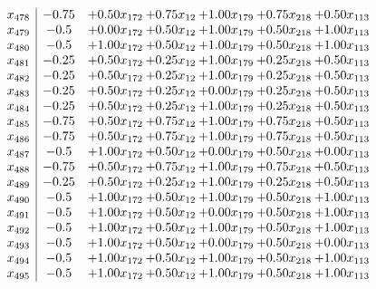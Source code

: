 \documentclass[8pt]{article}
\begin{document}
\[\begin{array}{c| c c@{\hskip 2pt} c@{\hskip 2pt} c@{\hskip 2pt} c@{\hskip 2pt} c@{\hskip 2pt} }
 x_{478}   &  -0.75 & +  0.50 x_{172} & +  0.75 x_{12} & +  1.00 x_{179} & +  0.75 x_{218} & +  0.50 x_{113}\\
 x_{479}   &  -0.5 & +  0.00 x_{172} & +  0.50 x_{12} & +  1.00 x_{179} & +  0.50 x_{218} & +  1.00 x_{113}\\
 x_{480}   &  -0.5 & +  1.00 x_{172} & +  0.50 x_{12} & +  1.00 x_{179} & +  0.50 x_{218} & +  1.00 x_{113}\\
 x_{481}   &  -0.25 & +  0.50 x_{172} & +  0.25 x_{12} & +  1.00 x_{179} & +  0.25 x_{218} & +  0.50 x_{113}\\
 x_{482}   &  -0.25 & +  0.50 x_{172} & +  0.25 x_{12} & +  1.00 x_{179} & +  0.25 x_{218} & +  0.50 x_{113}\\
 x_{483}   &  -0.25 & +  0.50 x_{172} & +  0.25 x_{12} & +  0.00 x_{179} & +  0.25 x_{218} & +  0.50 x_{113}\\
 x_{484}   &  -0.25 & +  0.50 x_{172} & +  0.25 x_{12} & +  1.00 x_{179} & +  0.25 x_{218} & +  0.50 x_{113}\\
 x_{485}   &  -0.75 & +  0.50 x_{172} & +  0.75 x_{12} & +  1.00 x_{179} & +  0.75 x_{218} & +  0.50 x_{113}\\
 x_{486}   &  -0.75 & +  0.50 x_{172} & +  0.75 x_{12} & +  1.00 x_{179} & +  0.75 x_{218} & +  0.50 x_{113}\\
 x_{487}   &  -0.5 & +  1.00 x_{172} & +  0.50 x_{12} & +  0.00 x_{179} & +  0.50 x_{218} & +  0.00 x_{113}\\
 x_{488}   &  -0.75 & +  0.50 x_{172} & +  0.75 x_{12} & +  1.00 x_{179} & +  0.75 x_{218} & +  0.50 x_{113}\\
 x_{489}   &  -0.25 & +  0.50 x_{172} & +  0.25 x_{12} & +  1.00 x_{179} & +  0.25 x_{218} & +  0.50 x_{113}\\
 x_{490}   &  -0.5 & +  1.00 x_{172} & +  0.50 x_{12} & +  1.00 x_{179} & +  0.50 x_{218} & +  1.00 x_{113}\\
 x_{491}   &  -0.5 & +  1.00 x_{172} & +  0.50 x_{12} & +  0.00 x_{179} & +  0.50 x_{218} & +  1.00 x_{113}\\
 x_{492}   &  -0.5 & +  1.00 x_{172} & +  0.50 x_{12} & +  1.00 x_{179} & +  0.50 x_{218} & +  1.00 x_{113}\\
 x_{493}   &  -0.5 & +  1.00 x_{172} & +  0.50 x_{12} & +  0.00 x_{179} & +  0.50 x_{218} & +  0.00 x_{113}\\
 x_{494}   &  -0.5 & +  1.00 x_{172} & +  0.50 x_{12} & +  1.00 x_{179} & +  0.50 x_{218} & +  1.00 x_{113}\\
 x_{495}   &  -0.5 & +  1.00 x_{172} & +  0.50 x_{12} & +  1.00 x_{179} & +  0.50 x_{218} & +  1.00 x_{113}\\

\end{array}\]
\end{document}
